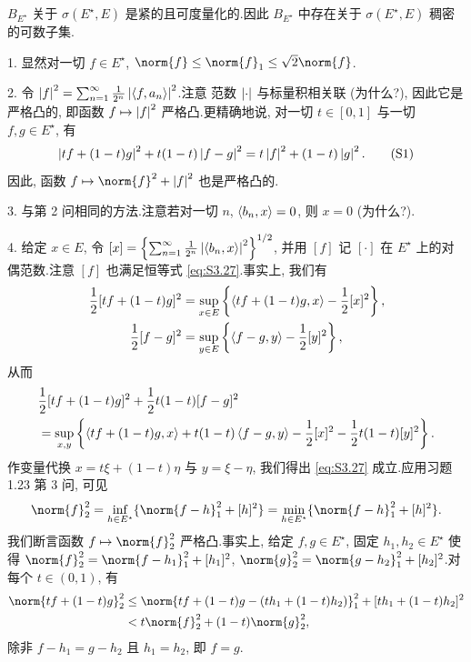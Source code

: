 $B_{E^\star}$ 关于 $\sigma(E^\star,E)$ 是紧的且可度量化的.因此 $B_{E^\star}$
中存在关于 $\sigma(E^\star,E)$ 稠密的可数子集.

1. 显然对一切 $f\in E^\star$, $\norm{f}\le\norm{f}_1\le\sqrt{2}\norm{f}$.

2. 令 $\left|f\right|^2=\sum_{n=1}^\infty\frac{1}{2^n}\left|\left\langle f,a_n\right\rangle\right|^2$.注意
范数 $\left|\cdot\right|$ 与标量积相关联 (为什么?), 因此它是严格凸的, 即函数
$f\mapsto\left|f\right|^2$ 严格凸.更精确地说, 对一切 $t\in[0,1]$ 与一切
$f,g\in E^\star$, 有
\begin{equation}
\left|tf+(1-t)g\right|^2+t(1-t)\left|f-g\right|^2=t\left|f\right|^2+(1-t)\left|g\right|^2.
\tag{S1}
\label{eq:S3.27}
\end{equation}
因此, 函数 $f\mapsto\norm{f}^2+\abs{f}^2$ 也是严格凸的.

3. 与第 2 问相同的方法.注意若对一切 $n$, $\left\langle b_n,x\right\rangle=0$, 则 $x=0$
(为什么?).

4. 给定 $x\in E$, 令
$[x]=\left\{\sum_{n=1}^\infty\frac{1}{2^n}\left|\left\langle b_n,x\right\rangle\right|^2\right\}^{1/2}$,
并用 $[f]$ 记 $[\cdot]$ 在 $E^\star$ 上的对偶范数.注意 $[f]$ 也满足恒等式
\eqref{eq:S3.27}.事实上, 我们有
\begin{align*}
\frac12[tf+(1-t)g]^2&=\sup_{x\in E}\left\{\left\langle tf+(1-t)g,x\right\rangle-\frac12[x]^2\right\},\\
\frac12[f-g]^2&=\sup_{y\in E}\left\{\left\langle f-g,y\right\rangle-\frac12[y]^2\right\},
\end{align*}
从而
\begin{align*}
&\frac12[tf+(1-t)g]^2+\frac12t(1-t)[f-g]^2\\
&=\sup_{x,y}\left\{\left\langle tf+(1-t)g,x\right\rangle+t(1-t)\left\langle f-g,y\right\rangle-\frac12[x]^2-\frac12t(1-t)[y]^2\right\}.
\end{align*}
作变量代换 $x=t\xi+(1-t)\eta$ 与 $y=\xi-\eta$, 我们得出 \eqref{eq:S3.27}
成立.应用习题 1.23 第 3 问, 可见
\begin{equation*}
\norm{f}_2^2=\inf_{h\in E^\star}\{\norm{f-h}_1^2+[h]^2\}=\min_{h\in E^\star}\{\norm{f-h}_1^2+[h]^2\}.
\end{equation*}
我们断言函数 $f\mapsto\norm{f}_2^2$ 严格凸.事实上, 给定 $f,g\in E^\star$,
固定 $h_1,h_2\in E^\star$ 使得 $\norm{f}_2^2=\norm{f-h_1}_1^2+[h_1]^2$,
$\norm{g}_2^2=\norm{g-h_2}_1^2+[h_2]^2$.对每个 $t\in(0,1)$, 有
\begin{align*}
\norm{tf+(1-t)g}_2^2&\le\norm{tf+(1-t)g-(th_1+(1-t)h_2)}_1^2+[th_1+(1-t)h_2]^2\\
&<t\norm{f}_2^2+(1-t)\norm{g}_2^2,
\end{align*}
除非 $f-h_1=g-h_2$ 且 $h_1=h_2$, 即 $f=g$.


